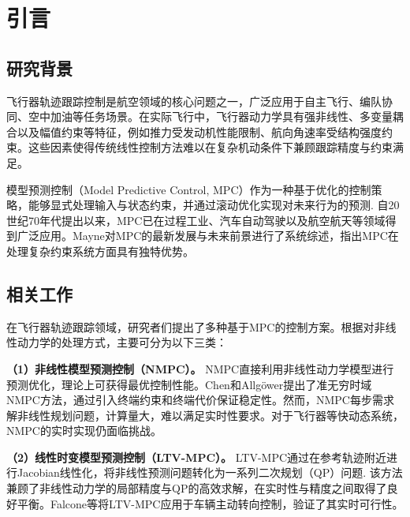 \section{引言}\label{sec:intro}

\subsection{研究背景}

飞行器轨迹跟踪控制是航空领域的核心问题之一，广泛应用于自主飞行、编队协同、空中加油等任务场景\cite{Qin2003,Mayne2014}。在实际飞行中，飞行器动力学具有强非线性、多变量耦合以及幅值约束等特征，例如推力受发动机性能限制、航向角速率受结构强度约束。这些因素使得传统线性控制方法难以在复杂机动条件下兼顾跟踪精度与约束满足。

模型预测控制（Model Predictive Control, MPC）作为一种基于优化的控制策略，能够显式处理输入与状态约束，并通过滚动优化实现对未来行为的预测\cite{Garcia1989,Rawlings2009}. 自20世纪70年代提出以来，MPC已在过程工业\cite{Qin2003}、汽车自动驾驶\cite{Falcone2007}以及航空航天等领域得到广泛应用。Mayne\cite{Mayne2014}对MPC的最新发展与未来前景进行了系统综述，指出MPC在处理复杂约束系统方面具有独特优势。

\subsection{相关工作}

在飞行器轨迹跟踪领域，研究者们提出了多种基于MPC的控制方案。根据对非线性动力学的处理方式，主要可分为以下三类：

\textbf{（1）非线性模型预测控制（NMPC）。} NMPC直接利用非线性动力学模型进行预测优化，理论上可获得最优控制性能。Chen和Allg\"ower\cite{Chen1998}提出了准无穷时域NMPC方法，通过引入终端约束和终端代价保证稳定性。然而，NMPC每步需求解非线性规划问题，计算量大，难以满足实时性要求。对于飞行器等快动态系统，NMPC的实时实现仍面临挑战。

\textbf{（2）线性时变模型预测控制（LTV-MPC）。} LTV-MPC通过在参考轨迹附近进行Jacobian线性化，将非线性预测问题转化为一系列二次规划（QP）问题\cite{Borrelli2017}. 该方法兼顾了非线性动力学的局部精度与QP的高效求解，在实时性与精度之间取得了良好平衡。Falcone等\cite{Falcone2007}将LTV-MPC应用于车辆主动转向控制，验证了其实时可行性。

